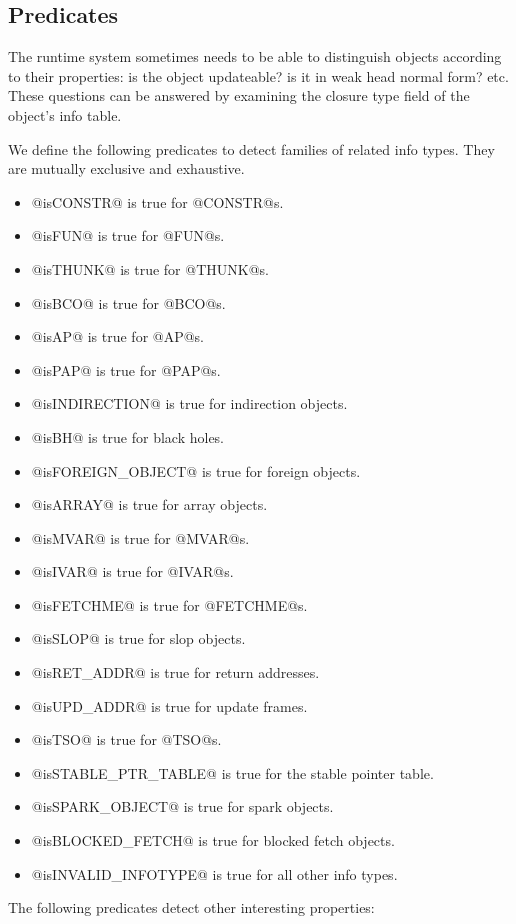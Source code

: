 \documentclass[11pt]{article}
\newcommand{\Subsection}[2]{\subsection{#1}\label{sec:#2}}
\begin{document}
\Subsection{Predicates}{closure-predicates}

The runtime system sometimes needs to be able to distinguish objects
according to their properties: is the object updateable? is it in weak
head normal form? etc.  These questions can be answered by examining
the closure type field of the object's info table.  

We define the following predicates to detect families of related
info types.  They are mutually exclusive and exhaustive.

\begin{itemize}
\item @isCONSTR@ is true for @CONSTR@s.
\item @isFUN@ is true for @FUN@s.
\item @isTHUNK@ is true for @THUNK@s.
\item @isBCO@ is true for @BCO@s.
\item @isAP@ is true for @AP@s.
\item @isPAP@ is true for @PAP@s.
\item @isINDIRECTION@ is true for indirection objects. 
\item @isBH@ is true for black holes.
\item @isFOREIGN_OBJECT@ is true for foreign objects.
\item @isARRAY@ is true for array objects.
\item @isMVAR@ is true for @MVAR@s.
\item @isIVAR@ is true for @IVAR@s.
\item @isFETCHME@ is true for @FETCHME@s.
\item @isSLOP@ is true for slop objects.
\item @isRET_ADDR@ is true for return addresses.
\item @isUPD_ADDR@ is true for update frames.
\item @isTSO@ is true for @TSO@s.
\item @isSTABLE_PTR_TABLE@ is true for the stable pointer table.
\item @isSPARK_OBJECT@ is true for spark objects.
\item @isBLOCKED_FETCH@ is true for blocked fetch objects.
\item @isINVALID_INFOTYPE@ is true for all other info types.

\end{itemize}

The following predicates detect other interesting properties:
\end{document}
